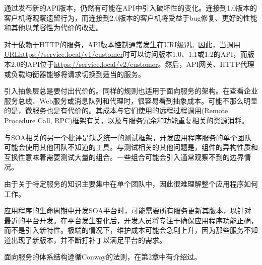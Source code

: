 通过发布新的API版本，仍然有可能在API中引入破坏性的变化。连接到1.0版本的客户机将观察遗留行为，而连接到2.0版本的客户机将受益于bug修复、更好的性能和其他以兼容性为代价的改进。

对于依赖于HTTP的服务，API版本控制通常发生在URI级别。因此，当调用\url{URLhttps://service.local/v1/customer}时可以访问版本1.0、1.1或1.2的API，而版本2.0的API位于\url{https://service.local/v2/customer}。然后，API网关、HTTP代理或负载均衡器能够将请求切换到适当的服务。


引入抽象层总是要付出代价的。同样的规则也适用于面向服务的架构。在查看企业服务总线、Web服务或消息队列和代理时，很容易看到抽象成本。可能不那么明显的是，微服务也是有代价的。其成本与它们使用的远程过程调用(Remote Procedure Call, RPC)框架有关，以及与服务冗余和功能重复相关的资源消耗。 

与SOA相关的另一个批评是缺乏统一的测试框架，开发应用程序服务的单个团队可能会使用其他团队不知道的工具。与测试相关的其他问题是，组件的异构性质和互换性意味着需要测试大量的组合。一些组合可能会引入通常观察不到的边界情况。

由于关于特定服务的知识主要集中在单个团队中，因此很难理解整个应用程序如何工作。

应用程序的生命周期中开发SOA平台时，可能需要所有服务更新其版本，以针对最近的平台开发。在平台发生变化后，开发人员将专注于确保应用程序功能正确，而不是引入新特性。极端的情况下，维护成本可能会急剧上升，因为那些服务不知道出现了新版本，并不断打补丁以满足平台的需求。

面向服务的体系结构遵循Conway的法则，在第2章中有介绍过。






